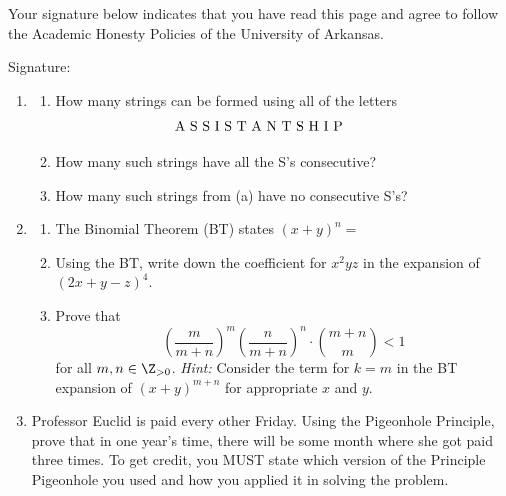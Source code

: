 \documentclass[12pt,letterpaper]{article}
\begin{document}
Your signature below indicates that you have read this page and agree to follow the Academic Honesty Policies of the University of Arkansas.  

\vspace{3pc}
Signature: \underline{\hspace{79ex}}

\begin{enumerate}

\newpage
\item 
\begin{enumerate}
\item How many strings can be formed using all of the letters 
\[\hspace{-3pc}\text{A S S I S T A N T S H I P}\]

\vspace{15pc}
\item How many such strings have all the S's consecutive?

\vspace{15pc}
\item How many such strings from (a) have no consecutive S's?
\end{enumerate}

\newpage
\item \begin{enumerate}
\item The Binomial Theorem (BT) states $(x+y)^n=$  

\vspace{2pc}
\item Using the BT, write down the coefficient for $x^2yz$ in the expansion of $(2x+y-z)^4$.

\vspace{15pc}
\item 
Prove that 
\[\left(\frac{m}{m+n}\right)^m\left(\frac{n}{m+n}\right)^n\cdot\binom{m+n}{m}<1\]
for all $m,n\in\Z_{>0}$.  {\it Hint:} Consider the term for $k=m$ in the BT expansion of $(x+y)^{m+n}$ for appropriate $x$ and $y$.

\end{enumerate}

\newpage
\item Professor Euclid is paid every other Friday.  Using the Pigeonhole Principle, prove that in one year's time, there will be some month where she got paid three times.  To get credit, you MUST state which version of the Principle Pigeonhole you used and how you applied it in solving the problem.


\end{enumerate}
\end{document}
